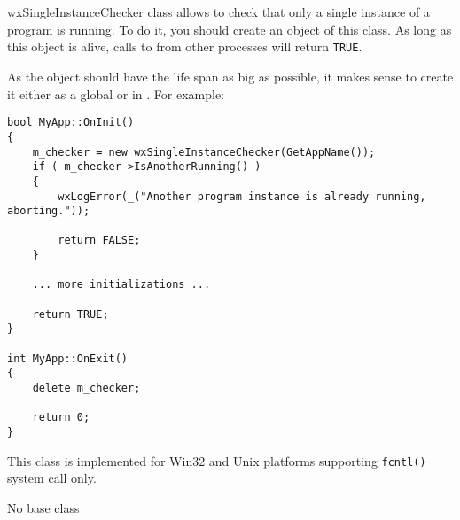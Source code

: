 
\section{}\label{wxsingleinstancechecker}

wxSingleInstanceChecker class allows to check that only a single instance of a
program is running. To do it, you should create an object of this class. As
long as this object is alive, calls to 
 from
other processes will return {\tt TRUE}.

As the object should have the life span as big as possible, it makes sense to
create it either as a global or in . For
example:

\begin{verbatim}
bool MyApp::OnInit()
{
    m_checker = new wxSingleInstanceChecker(GetAppName());
    if ( m_checker->IsAnotherRunning() )
    {
        wxLogError(_("Another program instance is already running, aborting."));

        return FALSE;
    }

    ... more initializations ...

    return TRUE;
}

int MyApp::OnExit()
{
    delete m_checker;

    return 0;
}
\end{verbatim}

This class is implemented for Win32 and Unix platforms supporting {\tt fcntl()}
system call only.


No base class



\label{wxsingleinstancecheckerctor}


